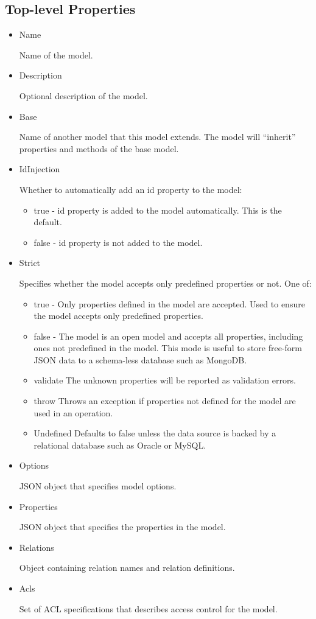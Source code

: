 \subsection{Top-level Properties}
\begin{itemize}
\item Name

Name of the model.

\item Description

Optional description of the model.

\item Base

Name of another model that this model extends. The model will ``inherit'' properties and methods of the base model.

\item IdInjection

Whether to automatically add an id property to the model:
\begin{itemize}
\item true - id property is added to the model automatically. This is the default.
\item false - id property is not added to the model.
\end{itemize}

\item Strict

Specifies whether the model accepts only predefined properties or not. One of:
\begin{itemize}
\item true - Only properties defined in the model are accepted. Used to ensure the model accepts only predefined properties.
\item false - The model is an open model and accepts all properties, including ones not predefined in the model. This mode is useful to store free-form JSON data to a schema-less database such as MongoDB.
\item validate The unknown properties will be reported as validation errors.
\item throw Throws an exception if properties not defined for the model are used in an operation.
\item Undefined Defaults to false unless the data source is backed by a relational database such as Oracle or MySQL.
\end{itemize}

\item Options

JSON object that specifies model options.

\item Properties

JSON object that specifies the properties in the model.

\item Relations

Object containing relation names and relation definitions.

\item Acls

Set of ACL specifications that describes access control for the model.

\end{itemize}


